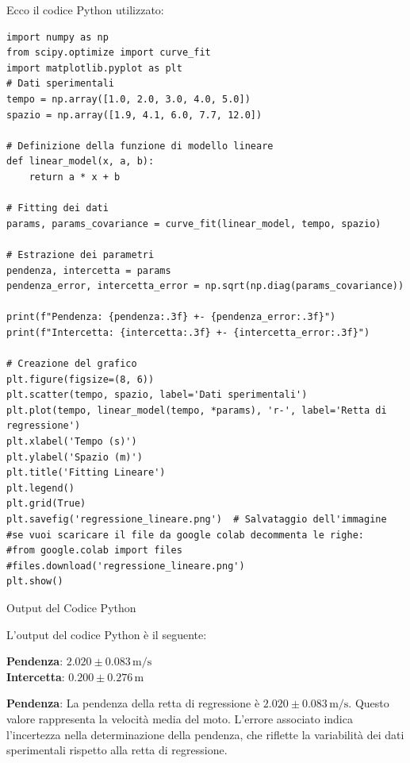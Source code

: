 \documentclass[12pt,a4paper,oneside]{book}
\makeatletter
\renewcommand{\subsection}{\@startsection {subsection}{2}{\z@}
{-3ex \@plus -0.1ex \@minus -.4ex}
{0.5ex \@plus.2ex }
{\color[rgb]{0.141,0.596,0.749}\normalfont\sffamily\bfseries}}
\theoremstyle{esercizio}
\makeatother
\begin{document}
Ecco il codice Python utilizzato:

\begin{lstlisting}[caption={Semplice regressione lineare}]
import numpy as np
from scipy.optimize import curve_fit
import matplotlib.pyplot as plt
# Dati sperimentali
tempo = np.array([1.0, 2.0, 3.0, 4.0, 5.0])
spazio = np.array([1.9, 4.1, 6.0, 7.7, 12.0])

# Definizione della funzione di modello lineare
def linear_model(x, a, b):
    return a * x + b

# Fitting dei dati
params, params_covariance = curve_fit(linear_model, tempo, spazio)

# Estrazione dei parametri
pendenza, intercetta = params
pendenza_error, intercetta_error = np.sqrt(np.diag(params_covariance))

print(f"Pendenza: {pendenza:.3f} +- {pendenza_error:.3f}")
print(f"Intercetta: {intercetta:.3f} +- {intercetta_error:.3f}")

# Creazione del grafico
plt.figure(figsize=(8, 6))
plt.scatter(tempo, spazio, label='Dati sperimentali')
plt.plot(tempo, linear_model(tempo, *params), 'r-', label='Retta di regressione')
plt.xlabel('Tempo (s)')
plt.ylabel('Spazio (m)')
plt.title('Fitting Lineare')
plt.legend()
plt.grid(True)
plt.savefig('regressione_lineare.png')  # Salvataggio dell'immagine
#se vuoi scaricare il file da google colab decommenta le righe:
#from google.colab import files
#files.download('regressione_lineare.png')
plt.show()
\end{lstlisting}

\subsection{Output del Codice Python}

L'output del codice Python è il seguente:

\begin{mdframed}[backgroundcolor=lightgray, linecolor=black, linewidth=1pt]
\textbf{Pendenza}: \(2.020 \pm 0.083 \, \si{\meter\per\second}\) \\
\textbf{Intercetta}: \(0.200 \pm 0.276 \, \si{\meter}\)
\end{mdframed}

\textbf{Pendenza}: La pendenza della retta di regressione è \(2.020 \pm 0.083 \, \si{\meter\per\second}\). Questo valore rappresenta la velocità media del moto. L'errore associato indica l'incertezza nella determinazione della pendenza, che riflette la variabilità dei dati sperimentali rispetto alla retta di regressione.
\end{document}
